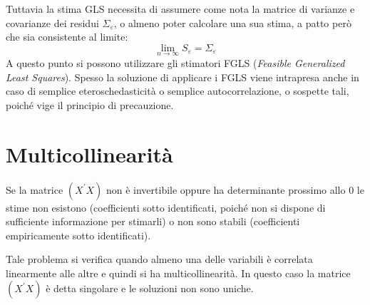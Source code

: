 \documentclass[a4page, 11pt]{article} %
\begin{document}
Tuttavia la stima GLS necessita di assumere come nota la matrice di varianze e covarianze dei residui $\Sigma_\varepsilon$, o almeno poter calcolare una sua stima, a patto però che sia consistente al limite:
\begin{equation*}
  \lim_{n\to \infty} S_\varepsilon = \Sigma_\varepsilon
\end{equation*}
A questo punto si possono utilizzare gli stimatori FGLS (\textit{Feasible Generalized Least Squares}).
Spesso la soluzione di applicare i FGLS viene intrapresa anche in caso di semplice eteroschedasticità o semplice autocorrelazione, o sospette tali, poiché vige il principio di precauzione.

\section{Multicollinearità }
Se la matrice $(X^{\prime} X)$ non è invertibile oppure ha determinante prossimo allo 0 le stime non esistono (coefficienti sotto identificati, poiché non si dispone di sufficiente informazione per stimarli) o non sono stabili (coefficienti empiricamente sotto identificati).

Tale problema si verifica quando almeno una delle variabili è correlata linearmente alle altre e quindi si ha multicollinearità. In questo caso la matrice $(X^{\prime} X)$ è detta singolare e le soluzioni non sono uniche. 
\end{document}
